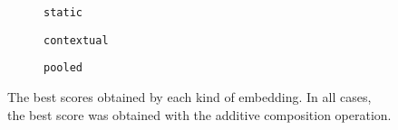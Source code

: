 \begin{figure}
  \centering
  \begin{subfigure}[b]{\textwidth}
    \centering
    \caption{\texttt{static}}
  \end{subfigure}
  \par\bigskip\par\bigskip
  \begin{subfigure}[b]{\textwidth}
    \centering
    \caption{\texttt{contextual}}
  \end{subfigure}
  \par\bigskip\par\bigskip
  \begin{subfigure}[b]{\textwidth}
    \centering
    \caption{\texttt{pooled}}
  \end{subfigure}
  \caption{The best scores obtained by each kind of embedding.
    In all cases, the best score was obtained with the additive composition operation.
  }
  \label{table:best-score}
\end{figure}
